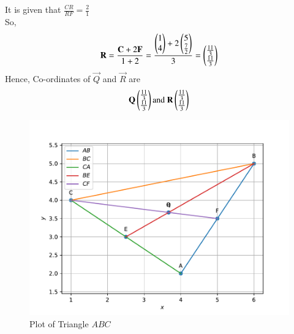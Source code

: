 \documentclass[journal]{IEEEtran}
\numberwithin{equation}{enumi}
\numberwithin{figure}{enumi}
\begin{document}
It is given that $\frac{CR}{RF}=\frac{2}{1}$\\
So,\\
\begin{align}
	\mathbf{R}=\frac{\mathbf{C}+2\mathbf{F}}{1+2}=\frac{\begin{pmatrix}1\\4\end{pmatrix} + 2\begin{pmatrix}5\\\frac{7}{2}\end{pmatrix}}{3}=\begin{pmatrix}\frac{11}{3}\\ \frac{11}{3}\end{pmatrix}
\end{align}
Hence, Co-ordinates of $\vec{Q}$ and $\vec{R}$ are\\
\begin{align}
    \vec{Q}\myvec{\frac{11}{3} \\ \frac{11}{3}} \text{and}\ \vec{R}\myvec{\frac{11}{3} \\ \frac{11}{3}}
\end{align}
\begin{figure}[h!]
   \centering
   \includegraphics[width=0.7\linewidth]{figs/Figure_1.pdf}
   \caption{Plot of Triangle $ABC$}
   \label{stemplot}
\end{figure}
\end{document}
